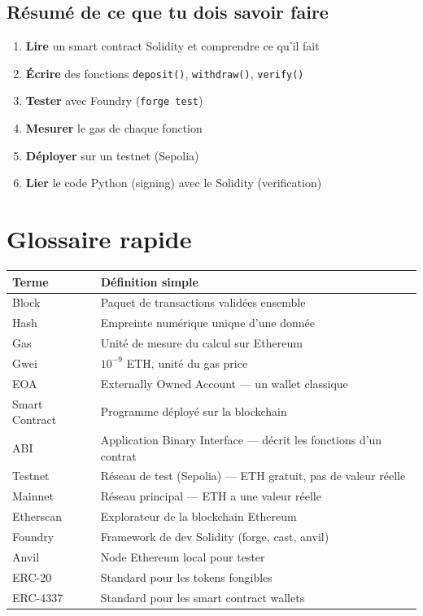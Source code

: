 \documentclass[12pt, a4paper]{article}
\begin{document}
\subsection{Résumé de ce que tu dois savoir faire}

\begin{tcolorbox}[colback=suva_blue!5, colframe=suva_blue]
\begin{enumerate}
  \item \textbf{Lire} un smart contract Solidity et comprendre ce qu'il fait
  \item \textbf{Écrire} des fonctions \texttt{deposit()}, \texttt{withdraw()}, \texttt{verify()}
  \item \textbf{Tester} avec Foundry (\texttt{forge test})
  \item \textbf{Mesurer} le gas de chaque fonction
  \item \textbf{Déployer} sur un testnet (Sepolia)
  \item \textbf{Lier} le code Python (signing) avec le Solidity (verification)
\end{enumerate}
\end{tcolorbox}

\section*{Glossaire rapide}

\begin{center}
\renewcommand{\arraystretch}{1.4}
\begin{tabular}{lp{10cm}}
  \toprule
  \textbf{Terme} & \textbf{Définition simple} \\
  \midrule
  Block & Paquet de transactions validées ensemble \\
  Hash & Empreinte numérique unique d'une donnée \\
  Gas & Unité de mesure du calcul sur Ethereum \\
  Gwei & $10^{-9}$ ETH, unité du gas price \\
  EOA & Externally Owned Account --- un wallet classique \\
  Smart Contract & Programme déployé sur la blockchain \\
  ABI & Application Binary Interface --- décrit les fonctions d'un contrat \\
  Testnet & Réseau de test (Sepolia) --- ETH gratuit, pas de valeur réelle \\
  Mainnet & Réseau principal --- ETH a une valeur réelle \\
  Etherscan & Explorateur de la blockchain Ethereum \\
  Foundry & Framework de dev Solidity (forge, cast, anvil) \\
  Anvil & Node Ethereum local pour tester \\
  ERC-20 & Standard pour les tokens fongibles \\
  ERC-4337 & Standard pour les smart contract wallets \\
  \bottomrule
\end{tabular}
\end{center}
\end{document}
